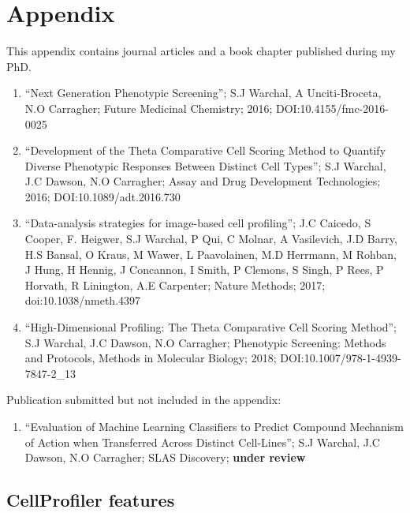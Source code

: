 \documentclass[a4paper,11pt]{scrbook}
\begin{document}
\chapter{Appendix}

\appendix

This appendix contains journal articles and a book chapter published during my PhD.

\begin{enumerate}
    \item ``Next Generation Phenotypic Screening''; S.J Warchal, A Unciti-Broceta, N.O Carragher; Future Medicinal 
Chemistry; 2016; DOI:10.4155/fmc-2016-0025
    \item ``Development of the Theta Comparative Cell Scoring Method to Quantify Diverse Phenotypic Responses Between 
Distinct Cell Types''; S.J Warchal, J.C Dawson, N.O Carragher; Assay and Drug Development Technologies; 2016; 
DOI:10.1089/adt.2016.730
    \item ``Data-analysis strategies for image-based cell profiling''; J.C Caicedo, S Cooper, F. Heigwer, S.J Warchal, 
P Qui, C Molnar, A Vasilevich, J.D Barry, H.S Bansal, O Kraus, M Wawer, L Paavolainen, M.D Herrmann, M Rohban, J Hung, 
H Hennig, J Concannon, I Smith, P Clemons, S Singh, P Rees, P Horvath, R Linington, A.E Carpenter; Nature Methods; 
2017; doi:10.1038/nmeth.4397
    \item ``High-Dimensional Profiling: The Theta Comparative Cell Scoring Method''; S.J Warchal, J.C Dawson, N.O 
Carragher; Phenotypic Screening: Methods and Protocols, Methods in Molecular Biology; 2018; 
DOI:10.1007/978-1-4939-7847-2\_13
\end{enumerate}

Publication submitted but not included in the appendix:

\begin{enumerate}
    \item ``Evaluation of Machine Learning Classifiers to Predict Compound Mechanism of Action when Transferred Across 
Distinct Cell-Lines''; S.J Warchal, J.C Dawson, N.O Carragher; SLAS Discovery; \textbf{under review}
\end{enumerate}






\section*{CellProfiler features}
\end{document}
